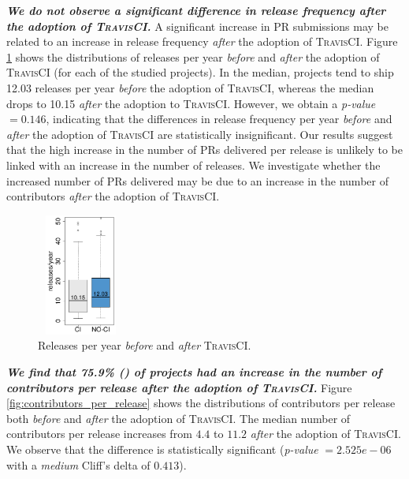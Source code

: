 \textit{\textbf{We do not observe a significant difference in release frequency
after the adoption of \textsc{TravisCI}.}} A significant increase in PR submissions may be related to
an increase in release frequency \textit{after} the adoption of \textsc{TravisCI}. Figure
\ref{fig:releases_per_year} shows the distributions of releases
per year \textit{before} and \textit{after} the adoption of \textsc{TravisCI} (for each of the
studied projects). In the median, projects tend to ship 12.03 releases per year
\textit{before} the adoption of \textsc{TravisCI}, whereas the median drops to 10.15 \textit{after} the adoption to \textsc{TravisCI}. However, we obtain a
\textit{p-value} $= 0.146$, indicating that the differences in release frequency 
per year \textit{before} and \textit{after} the adoption of \textsc{TravisCI}
 are statistically insignificant. Our results suggest
that the high increase in the number of PRs delivered per release is unlikely to be linked with an increase in the number of releases. 
We investigate whether the increased number of PRs delivered may be due to an increase in the number of contributors
\textit{after} the adoption of \textsc{TravisCI}. 

\begin{figure}[!t]
	\centering
	\includegraphics[width=2.9cm, height=4.0cm]{releases_per_year.pdf}
	\caption{Releases per year \textit{before} and \textit{after} \textsc{TravisCI}.}
	\label{fig:releases_per_year}
\end{figure}

\textbf{\textit{We find that 75.9\% () of projects
had an increase in the number of contributors per release after the adoption of \textsc{TravisCI}.}}
Figure \ref{fig:contributors_per_release} shows the distributions of contributors per release both \textit{before} and \textit{after} the adoption of \textsc{TravisCI}. The median number of contributors per release increases from $4.4$ to $11.2$ \textit{after} the adoption of \textsc{TravisCI}. We observe that the difference 
is statistically significant (\textit{p-value} $= 2.525e-06$ with a {\em medium} Cliff's delta of $0.413$). 

